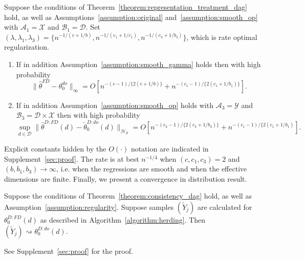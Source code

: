 \begin{theorem}\label{theorem:consistency_dag}
Suppose the conditions of Theorem~\ref{theorem:representation_treatment_dag} hold, as well as Assumptions~\ref{assumption:original} and~\ref{assumption:smooth_op} with $\mathcal{A}_1=\mathcal{X}$ and $\mathcal{B}_1=\mathcal{D}$. Set $(\lambda,\lambda_1,\lambda_3)=\{n^{-1/(c+1/b)},n^{-1/(c_1+1/c_1)},n^{-1/(c_3+1/b_3)}\}$, which is rate optimal regularization.
\begin{enumerate}
    \item If in addition Assumption~\ref{assumption:smooth_gamma} holds then with high probability $$    \|\hat{\theta}^{FD}-\theta_0^{do}\|_{\infty}=O\left[n^{-(c-1)/\{2(c+1/b)\}}+n^{-(c_1-1)/\{2(c_1+1/b_1)\}}\right].
$$
    \item If in addition Assumption~\ref{assumption:smooth_op} holds with $\mathcal{A}_3=\mathcal{Y}$ and $\mathcal{B}_3=\mathcal{D}\times \mathcal{X}$ then with high probability
    $$
    \sup_{d\in\mathcal{D}}\|\hat{\theta}^{D:FD}(d)-\check{\theta}_0^{D:do}(d)\|_{\mathcal{H}_{\mathcal{Y}}}=O\left[n^{-(c_3-1)/\{2(c_3+1/b_3)\}}+n^{-(c_1-1)/\{2(c_1+1/b_1)}\right].
$$
\end{enumerate}

\end{theorem}
Explicit constants hidden by the $O(\cdot)$ notation are indicated in Supplement~\ref{sec:proof}. The rate is at best $n^{-1/4}$ when $(c,c_1,c_3)=2$ and $(b,b_1,b_3)\rightarrow \infty$, i.e. when the regressions are smooth and when the effective dimensions are finite. 
 Finally, we present a convergence in distribution result.

\begin{theorem}\label{theorem:conv_dist_dag}
Suppose the conditions of Theorem~\ref{theorem:consistency_dag} hold, as well as Assumption~\ref{assumption:regularity}. Suppose samples $(\tilde{Y}_j)$ are calculated for $\theta_0^{D:FD}(d)$ as described in Algorithm~\ref{algorithm:herding}. Then $(\tilde{Y}_j)\rightsquigarrow \theta_0^{D:do}(d)$.
\end{theorem}
See Supplement~\ref{sec:proof} for the proof. %